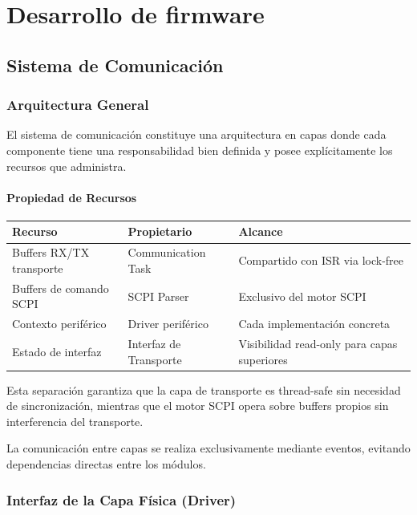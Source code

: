 \chapter[Desarrollo de firmware]{Desarrollo de firmware}
\label{cp:desarrolloFirmware}

\section{Sistema de Comunicación}
\label{sec:comm-subsistema}

\subsection{Arquitectura General}
\label{subsec:arquitectura-general}

El sistema de comunicación constituye una arquitectura en capas donde cada componente tiene una responsabilidad bien definida y posee explícitamente los recursos que administra.

\subsubsection{Propiedad de Recursos}

\noindent
\begin{tabular}{lll}
\toprule
\textbf{Recurso} & \textbf{Propietario} & \textbf{Alcance} \\
\midrule
Buffers RX/TX transporte & Communication Task & Compartido con ISR via lock-free \\
Buffers de comando SCPI & SCPI Parser & Exclusivo del motor SCPI \\
Contexto periférico & Driver periférico & Cada implementación concreta \\
Estado de interfaz & Interfaz de Transporte & Visibilidad read-only para capas superiores \\
\bottomrule
\end{tabular}
\newline

Esta separación garantiza que la capa de transporte es thread-safe sin necesidad de sincronización, mientras que el motor SCPI opera sobre buffers propios sin interferencia del transporte.

La comunicación entre capas se realiza exclusivamente mediante eventos, evitando dependencias directas entre los módulos.

\subsection{Interfaz de la Capa Física (Driver)}
\label{subsec:interfaz-driver}

